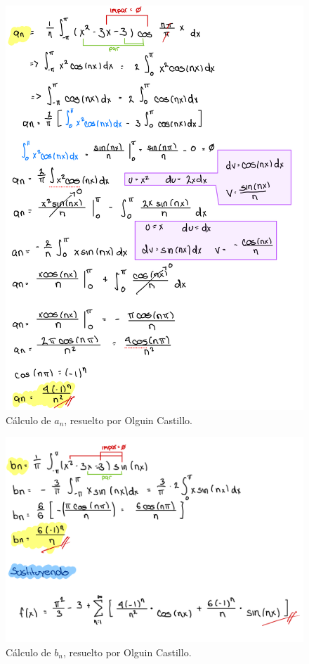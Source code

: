{%
    \begin{figure}[H]
        \centering
        \includegraphics[width=\linewidth]{Figures/fourierManuel/an.jpeg}
        \caption[Cálculo de \(a_n\)]{Cálculo de \(a_n\), resuelto por Olguin Castillo.}
        \label{fig:figure-manuel-02}
    \end{figure}

\begin{figure}[H]
        \centering
        \includegraphics[width=\linewidth]{Figures/fourierManuel/bn.jpeg}
        \caption[Cálculo de \(b_n\)]{Cálculo de \(b_n\), resuelto por Olguin Castillo.}
        \label{fig:figure-manuel-03}
    \end{figure}

}
